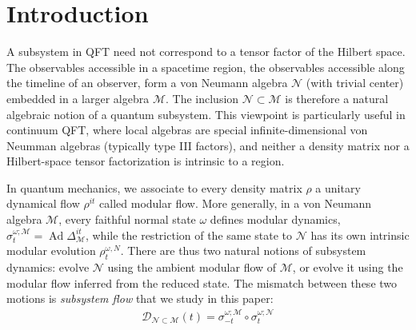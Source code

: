 \documentclass[a4paper,11pt]{article}
\theoremstyle{definition}
\newcommand{\mN}{\mathcal{N}}
\newcommand{\mM}{\mathcal{M}}
\begin{document}


\maketitle
\section{Introduction}\label{sec:intro}

A subsystem in QFT need not correspond to a tensor factor of the Hilbert space.  The observables accessible in a spacetime region, the observables accessible along the timeline of an observer, form a von Neumann algebra $\mN$ (with trivial center) embedded in a larger algebra $\mM$.  The inclusion $\mN\subset\mM$
is therefore a natural algebraic notion of a quantum subsystem.  This viewpoint is particularly useful in continuum QFT, where local algebras are special infinite-dimensional von Neumman algebras (typically type III factors), and neither a density matrix nor a Hilbert-space tensor factorization is intrinsic to a region.

In quantum mechanics, we associate to every density matrix $\rho$ a unitary dynamical flow $\rho^{it}$ called modular flow. More generally, in a von Neumann algebra $\mM$, every faithful normal state $\omega$ defines modular dynamics, $
    \sigma_t^{\omega;\mM}
    =
    \operatorname{Ad}\Delta_{\mM}^{it}$,
while the restriction of the same state to $\mN$ has its own intrinsic modular evolution $\rho_t^{\omega,N}$. There are thus two natural notions of subsystem dynamics: evolve $\mN$ using the ambient modular flow of $\mM$, or evolve it using the modular flow inferred from the reduced state.  The mismatch between these two motions is \emph{subsystem flow} that we study in this paper: 
\begin{align}
    \mathcal{D}_{\mN\subset\mM}(t)=\sigma_{-t}^{\omega;\mM}\circ \sigma_{t}^{\omega;\mN}
\end{align}
\end{document}

